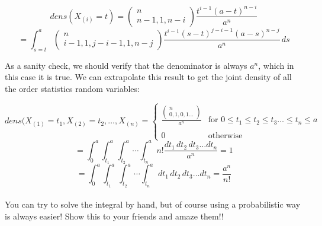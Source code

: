 \begin{displaymath}
dens (X_{(i)}=t) = \left( \begin{array}{c} n\\ n-1, 1, n-i \end{array} \right) 
\frac {t^{i-1} (a-t)^{n-i}} {a^n}
\end{displaymath}
\begin{displaymath}
 = \int_{s=t}^a \left( \begin{array} {c} n\\ i-1, 1, j-i-1, 1 , n-j \end{array} \right) \frac {t^{i-1} (s-t)^{j-i-1} (a-s)^{n-j}} {a^n} \, ds
\end{displaymath}

As a sanity check, we should verify that the denominator is always $a^n$, which in this case it is true.  We can extrapolate this result to get the joint density of all the order statistics random variables:

\begin{displaymath}
dens(X_{(1)}= t_1, X_{(2)}=t_2, \ldots , X_{(n)} = 
\left\{ \begin{array}{ll}
\frac {\left( \begin{array}{c} n\\ 0,1,0,1 \ldots \end{array} \right)} {a^n} &      \mbox{for $0 \leq t_1 \leq t_2 \leq t_3 \ldots \leq t_n \leq a$}\\ \\
 0 & \mbox{otherwise} \end{array}\right.
\end{displaymath}
\begin{displaymath}
= \int_0^a \int_{t_1}^a \int_{t_2}^a \cdots \int_{t_n}^a \, n! \frac {dt_1 \, dt_2 \, dt_3 \ldots dt_n} {a^n} = 1
\end{displaymath}
\begin{displaymath}
= \int_0^a \int_{t_1}^a \int_{t_2}^a \cdots \int_{t_n}^a \,dt_1 \, dt_2 \, dt_3 \ldots dt_n  = \frac {a^n} {n!}
\end{displaymath}\\
You can try to solve the integral by hand, but of course using a probabilistic way is always easier!  Show this to your friends and amaze them!!


